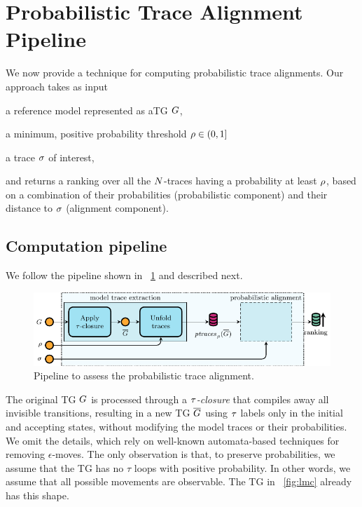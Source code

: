 
\section{Probabilistic Trace Alignment Pipeline}
We now provide a technique for computing probabilistic trace alignments. Our approach takes as input
\begin{inparaenum}[\it (i)]
\item a reference model represented as aTG $G$,
\item a minimum, positive probability threshold $\rho \in (0,1]$
\item a trace $\sigma$ of interest,
\end{inparaenum}
and returns a ranking over all the $N$-traces having a probability at least $\rho$, based on a combination of their probabilities 
(probabilistic component) and their distance to $\sigma$ (alignment component).


\subsection{Computation pipeline}
We follow the pipeline shown in \figurename~\ref{fig:pipe} and described next.
%
\begin{figure}[!t]
	\includegraphics[width=\columnwidth]{images/pipelineShort}
	\caption{Pipeline to assess the probabilistic trace alignment.}\label{fig:pipe}
\end{figure}
%
%
%
The original TG $G$ is processed through a \emph{$\tau$-closure} that compiles away all invisible transitions, resulting in
a new TG $\overline{G}$ using $\tau$ labels only in the initial and accepting states, without modifying the 
model traces or their probabilities. We omit the details, which rely on well-known automata-based techniques for removing 
$\epsilon$-moves. The only observation is that, to preserve probabilities, we assume that the TG has no $\tau$ loops with
positive probability. In other words, we assume that all possible movements are observable. 
The TG in \figurename~\ref{fig:lmc} already has this shape.

